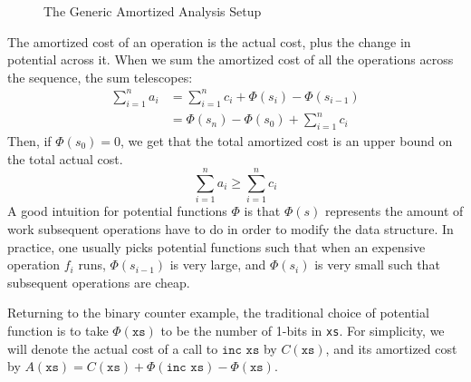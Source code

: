 \documentclass[draft]{westhesis}
\begin{document}
\begin{figure}
  \caption{The Generic Amortized Analysis Setup}
  \label{fig:amortized-situation}
\end{figure}

The amortized cost of an operation is the actual cost, plus the change in potential across it. When we sum the amortized cost of all the operations across the sequence, the sum telescopes:
\begin{align*}
  \sum_{i=1}^n a_i &= \sum_{i=1}^n c_i + \Phi(s_i) - \Phi(s_{i-1})\\
                   &= \Phi(s_n) - \Phi(s_0) + \sum_{i=1}^n c_i
\end{align*}
Then, if $\Phi(s_0) = 0$, we get that the total amortized cost is an upper bound on the total actual cost.
$$
\sum_{i=1}^n a_i \geq \sum_{i=1}^n c_i
$$
A good intuition for potential functions $\Phi$ is that $\Phi(s)$ represents the amount of work subsequent operations have to do in order to modify the data structure.
In practice, one usually picks potential functions such that when an expensive operation $f_i$ runs, $\Phi(s_{i-1})$ is very large, and $\Phi(s_i)$ is very small such that subsequent operations are cheap.

Returning to the binary counter example, the traditional choice of potential function is to take $\Phi(\texttt{xs})$ to be the number of 1-bits in \texttt{xs}.
For simplicity, we will denote the actual cost of a call to $\texttt{inc xs}$ by $C(\texttt{xs})$, and its amortized cost by $A(\texttt{xs}) = C(\texttt{xs}) + \Phi(\texttt{inc xs}) - \Phi(\texttt{xs})$.
\end{document}
